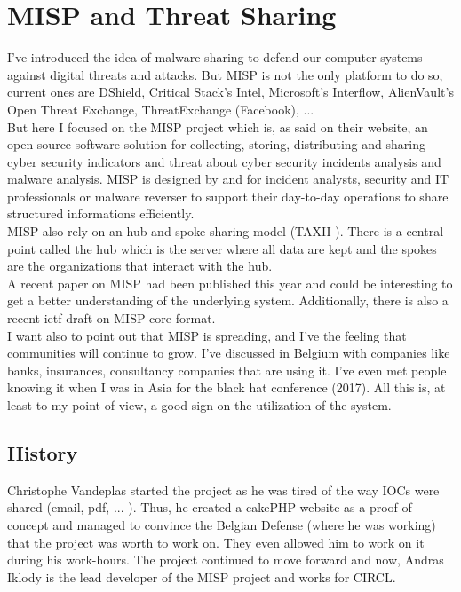 \documentclass{eplmastersthesis}
\begin{document}
\section{MISP and Threat Sharing}
I've introduced the idea of malware sharing to defend our computer systems against digital threats and attacks. But MISP is not the only platform to do so, current ones are DShield, Critical Stack’s Intel, Microsoft’s Interflow, AlienVault’s Open Threat Exchange, ThreatExchange (Facebook), ...\\
But here I focused on the MISP project which is, as said on their website, an open source software solution for collecting, storing, distributing and sharing cyber security indicators and threat about cyber security incidents analysis and malware analysis. MISP is designed by and for incident analysts, security and IT professionals or malware reverser to support their day-to-day operations to share structured informations efficiently.\\
MISP also rely on an hub and spoke sharing model (TAXII \cite{taxiiWebsite}). There is a central point called the hub which is the server where all data are kept and the spokes are the organizations that interact with the hub.\\
A recent paper on MISP \cite{wagner2016misp} had been published this year and could be interesting to get a better understanding of the underlying system. Additionally, there is also a recent ietf draft on MISP core format\cite{MispDraft}.\\
I want also to point out that MISP is spreading, and I've the feeling that communities will continue to grow. I've discussed in Belgium with companies like banks, insurances, consultancy companies that are using it. I've even met people knowing it when I was in Asia for the black hat conference (2017). All this is, at least to my point of view, a good sign on the utilization of the system.

\subsection{History}
Christophe Vandeplas started the project as he was tired of the way IOCs were shared (email, pdf, ... ). Thus, he created a cakePHP website as a proof of concept and managed to convince the Belgian Defense (where he was working) that the project was worth to work on. They even allowed him to work on it during his work-hours. The project continued to move forward and now, Andras Iklody is the lead developer of the MISP project and works for CIRCL.\\
\end{document}
